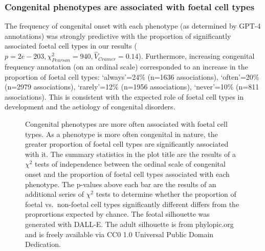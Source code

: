 \documentclass[
]{agujournal2019}
\begin{document}
\subsubsection{Congenital phenotypes are associated with foetal cell
types}\label{congenital-phenotypes-are-associated-with-foetal-cell-types}

The frequency of congenital onset with each phenotype (as determined by
GPT-4 annotations) was strongly predictive with the proportion of
significantly associated foetal cell types in our results
(\(p=2e-203,\chi^2_{Pearson}=940,\hat{V}_{Cramer}=0.14\)). Furthermore,
increasing congenital frequency annotation (on an ordinal scale)
corresponded to an increase in the proportion of foetal cell types:
`always'=24\% (n=1636 associations), `often'=20\% (n=2979 associations),
`rarely'=12\% (n=1956 associations), `never'=10\% (n=811 associations).
This is consistent with the expected role of foetal cell types in
development and the aetiology of congenital disorders.

\label{cell-fig-congenital}
\begin{figure}[H]


\caption{\label{fig-congenital}Congenital phenotypes are more often
associated with foetal cell types. As a phenotype is more often
congenital in nature, the greater proportion of foetal cell types are
significantly associated with it. The summary statistics in the plot
title are the results of a \(\chi^2\) tests of independence between the
ordinal scale of congenital onset and the proportion of foetal cell
types associated with each phenotype. The p-values above each bar are
the results of an additional series of \(\chi^2\) tests to determine
whether the proportion of foetal vs.~non-foetal cell types significantly
different differs from the proprortions expected by chance. The feotal
silhouette was generated with DALL-E. The adult silhouette is from
phylopic.org and is freely available via CC0 1.0 Universal Public Domain
Dedication.}

\end{figure}%
\end{document}
